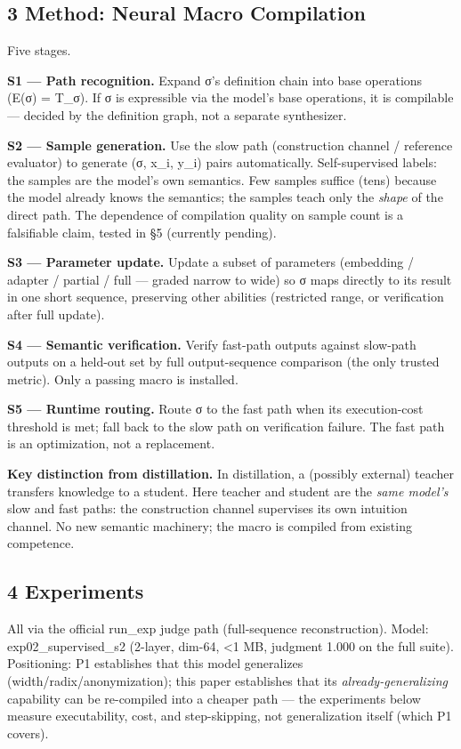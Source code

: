 \documentclass[
]{article}
\begin{document}
\subsection{3 Method: Neural Macro
Compilation}\label{method-neural-macro-compilation}

Five stages.

\textbf{S1 --- Path recognition.} Expand σ's definition chain into base
operations (E(σ) = T\_σ). If σ is expressible via the model's base
operations, it is compilable --- decided by the definition graph, not a
separate synthesizer.

\textbf{S2 --- Sample generation.} Use the slow path (construction
channel / reference evaluator) to generate (σ, x\_i, y\_i) pairs
automatically. Self-supervised labels: the samples are the model's own
semantics. Few samples suffice (tens) because the model already knows
the semantics; the samples teach only the \emph{shape} of the direct
path. The dependence of compilation quality on sample count is a
falsifiable claim, tested in §5 (currently pending).

\textbf{S3 --- Parameter update.} Update a subset of parameters
(embedding / adapter / partial / full --- graded narrow to wide) so σ
maps directly to its result in one short sequence, preserving other
abilities (restricted range, or verification after full update).

\textbf{S4 --- Semantic verification.} Verify fast-path outputs against
slow-path outputs on a held-out set by full output-sequence comparison
(the only trusted metric). Only a passing macro is installed.

\textbf{S5 --- Runtime routing.} Route σ to the fast path when its
execution-cost threshold is met; fall back to the slow path on
verification failure. The fast path is an optimization, not a
replacement.

\textbf{Key distinction from distillation.} In distillation, a (possibly
external) teacher transfers knowledge to a student. Here teacher and
student are the \emph{same model's} slow and fast paths: the
construction channel supervises its own intuition channel. No new
semantic machinery; the macro is compiled from existing competence.

\subsection{4 Experiments}\label{experiments}

All via the official run\_exp judge path (full-sequence reconstruction).
Model: exp02\_supervised\_s2 (2-layer, dim-64, \textless1 MB, judgment
1.000 on the full suite). Positioning: P1 establishes that this model
generalizes (width/radix/anonymization); this paper establishes that its
\emph{already-generalizing} capability can be re-compiled into a cheaper
path --- the experiments below measure executability, cost, and
step-skipping, not generalization itself (which P1 covers).
\end{document}
